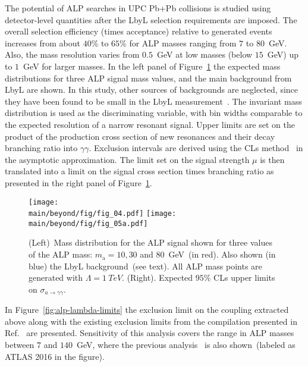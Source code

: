\documentclass[../report.tex]{subfiles}
\providecommand{\main}{..}
\begin{document}
The potential of ALP searches in UPC Pb+Pb collisions is studied using detector-level quantities after the LbyL selection requirements are imposed. The overall selection efficiency (times acceptance) relative to generated events increases from about $40$\% to $65$\% for ALP masses ranging from $7$ to $80$~GeV. Also, the mass resolution varies from $0.5$~GeV at low masses (below $15$~GeV) up to $1$~GeV for larger masses. In the left panel of Figure~\ref{fig:alp} the expected mass distributions for three ALP signal mass values, and the main background from LbyL are shown. In this study, other sources of backgrounds are neglected, since they have been found to be small in the LbyL measurement~\cite{Aaboud:2017bwk}. The invariant mass distribution is used as the discriminating variable, with bin widths comparable to the expected resolution of a narrow resonant signal.
Upper limits are set on the product of the production cross section of
new resonances and their decay branching ratio into $\gamma
\gamma$. Exclusion intervals are derived using the CLs method~\cite{Read:2002hq} in the asymptotic approximation. The limit set on the signal strength $\mu$ is then translated into a limit on the signal cross section times branching ratio as presented in the right panel of Figure~\ref{fig:alp}.
\begin{figure}[!htbp]
\centering
  \texttt{[image: \\main/beyond/fig/fig\_04.pdf]}
  \texttt{[image: \\main/beyond/fig/fig\_05a.pdf]}
  \caption{(Left)~Mass distribution for the ALP signal
  shown for three values of the ALP mass: $m_\mathrm{a}=10, 30$ and
  $80$~GeV~(in red). Also shown (in blue) the LbyL background~(see
  text). All ALP mass points are generated with $\Lambda = 1~TeV$.
  (Right). Expected $95\%$ CLs upper limits on $\sigma_{a\rightarrow \gamma \gamma}$. }
  \label{fig:alp}
\end{figure}

In Figure~\ref{fig:alp-lambda-limits} the exclusion limit on the coupling extracted above along with the
existing exclusion limits from the compilation presented in Ref.~\cite{Baldenegro:2018hng} are presented.
Sensitivity of this analysis covers the range in ALP masses between $7$ and $140$~GeV, where the previous analysis~\cite{Knapen:2016moh} is also shown~(labeled as ATLAS 2016 in the figure).
\end{document}
